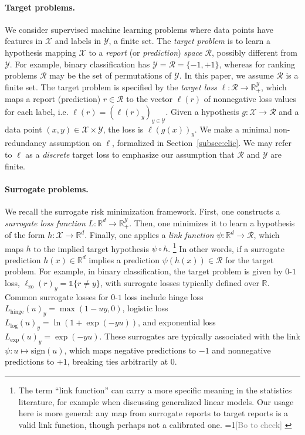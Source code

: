 \documentclass{article}
\theoremstyle{definition}\newtheorem{definition}{Definition}
\theoremstyle{definition}\newtheorem{assumption}{Assumption}
\newcommand{\Comments}{1}
\newcommand{\mynote}[2]{\ifnum\Comments=1\textcolor{#1}{#2}\fi}
\newcommand{\bocheck}[1]{\mynote{gray}{[Bo to check] #1}}
\newcommand{\reals}{\mathbb{R}}
\newcommand{\R}{\mathcal{R}}
\newcommand{\X}{\mathcal{X}}
\newcommand{\Y}{\mathcal{Y}}
\newcommand{\ones}{\mathds{1}}  %
\newcommand{\hinge}{L_{\mathrm{hinge}}}
\newcommand{\logistic}{L_{\mathrm{log}}}
\newcommand{\exploss}{L_{\mathrm{exp}}}
\newcommand{\zeroone}{\ell_{\mathrm{zo}}}
\newcommand{\sign}{\mathrm{sign}}
\begin{document}
\paragraph{Target problems.}
We consider supervised machine learning problems where data points have features in $\X$ and labels in $\Y$, a finite set.
The \emph{target problem} is to learn a hypothesis mapping $\X$ to a \emph{report} (or \emph{prediction}) \emph{space} $\R$, possibly different from $\Y$.
For example, binary classification has $\Y = \R = \{-1,+1\}$, whereas for ranking problems $\R$ may be the set of permutations of $\Y$.
In this paper, we assume $\R$ is a finite set.
The target problem is specified by the \emph{target loss} $\ell:\R\to\reals^\Y_+$, which maps a report (prediction) $r \in \R$ to the vector $\ell(r)$ of nonnegative loss values for each label, i.e. $\ell(r) = (\ell(r)_y)_{y\in\Y}$.
Given a hypothesis $g: \X \to \R$ and a data point $(x,y) \in \X \times \Y$, the loss is $\ell(g(x))_y$.
We make a minimal non-redundancy assumption on $\ell$, formalized in Section~\ref{subsec:elic}.
We may refer to $\ell$ as a \emph{discrete} target loss to emphasize our assumption that $\R$ and $\Y$ are finite.

\paragraph{Surrogate problems.}
We recall the surrogate risk minimization framework.
First, one constructs a \emph{surrogate loss function} $L:\reals^d\to\reals^\Y_+$.
Then, one minimizes it to learn a hypothesis of the form $h: \X \to \reals^d$.
Finally, one applies a \emph{link function} $\psi: \reals^d \to \R$, which maps $h$ to the implied target hypothesis $\psi \circ h$.%
\footnote{The term ``link function'' can carry a more specific meaning in the statistics literature, for example when discussing generalized linear models.
  Our usage here is more general: any map from surrogate reports to target reports is a valid link function, though perhaps not a calibrated one. \bocheck{}}
In other words, if a surrogate prediction $h(x) \in \reals^d$ implies a prediction $\psi(h(x)) \in \R$ for the target problem.
For example, in binary classification, the target problem is given by $0$-$1$ loss, $\zeroone(r)_y = \ones\{r\neq y\}$, with surrogate losses typically defined over $\reals$.
Common surrogate losses for $0$-$1$ loss include hinge loss $\hinge(u)_y = \max(1 - uy,0)$,
logistic loss $\logistic(u)_y = \ln\left(1 + \exp(-yu)\right)$,
and exponential loss $\exploss(u)_y = \exp(-yu)$.
These surrogates are typically associated with the link $\psi: u\mapsto \sign(u)$, which maps negative predictions to $-1$ and nonnegative predictions to $+1$, breaking ties arbitrarily at $0$.
\end{document}
